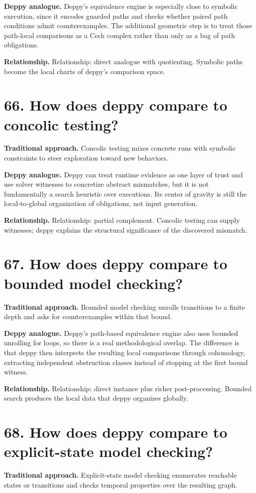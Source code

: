 \documentclass[11pt,openany]{book}
\begin{document}
\textbf{Deppy analogue.} Deppy's equivalence engine is especially close to symbolic execution, since it encodes guarded paths and checks whether paired path conditions admit counterexamples. The additional geometric step is to treat those path-local comparisons as a Cech complex rather than only as a bag of path obligations.

\textbf{Relationship.} Relationship: direct analogue with quotienting. Symbolic paths become the local charts of deppy's comparison space.

\section*{66. How does deppy compare to concolic testing?}
\textbf{Traditional approach.} Concolic testing mixes concrete runs with symbolic constraints to steer exploration toward new behaviors.

\textbf{Deppy analogue.} Deppy can treat runtime evidence as one layer of trust and use solver witnesses to concretize abstract mismatches, but it is not fundamentally a search heuristic over executions. Its center of gravity is still the local-to-global organization of obligations, not input generation.

\textbf{Relationship.} Relationship: partial complement. Concolic testing can supply witnesses; deppy explains the structural significance of the discovered mismatch.

\section*{67. How does deppy compare to bounded model checking?}
\textbf{Traditional approach.} Bounded model checking unrolls transitions to a finite depth and asks for counterexamples within that bound.

\textbf{Deppy analogue.} Deppy's path-based equivalence engine also uses bounded unrolling for loops, so there is a real methodological overlap. The difference is that deppy then interprets the resulting local comparisons through cohomology, extracting independent obstruction classes instead of stopping at the first bound witness.

\textbf{Relationship.} Relationship: direct instance plus richer post-processing. Bounded search produces the local data that deppy organizes globally.

\section*{68. How does deppy compare to explicit-state model checking?}
\textbf{Traditional approach.} Explicit-state model checking enumerates reachable states or transitions and checks temporal properties over the resulting graph.
\end{document}
